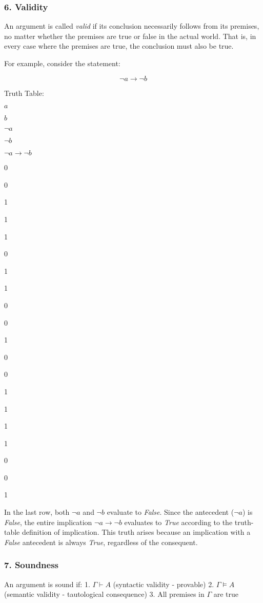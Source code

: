 \subsubsection{6. Validity}\label{validity}

An argument is called \emph{valid} if its conclusion necessarily follows
from its premises, no matter whether the premises are true or false in
the actual world. That is, in every case where the premises are true,
the conclusion must also be true.

For example, consider the statement:

\[
\neg a \to \neg b
\]

Truth Table:

\(a\)

\(b\)

\(\neg a\)

\(\neg b\)

\(\neg a \to \neg b\)

0

0

1

1

1

0

1

1

0

0

1

0

0

1

1

1

1

0

0

1

In the last row, both \(\neg a\) and \(\neg b\) evaluate to
\emph{False}. Since the antecedent (\(\neg a\)) is \emph{False}, the
entire implication \(\neg a \to \neg b\) evaluates to \emph{True}
according to the truth-table definition of implication. This truth
arises because an implication with a \emph{False} antecedent is always
\emph{True}, regardless of the consequent.

\subsubsection{7. Soundness}\label{soundness}

An argument is sound if: 1. \(\Gamma \vdash A\) (syntactic validity -
provable) 2. \(\Gamma \models A\) (semantic validity - tautological
consequence) 3. All premises in \(\Gamma\) are true

